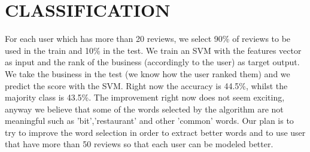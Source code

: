 \documentclass[a4paper, 10pt, conference]{ieeeconf}      %
\begin{document}
\section{CLASSIFICATION}
For each user which has more than 20 reviews, we select 90\% of reviews to be used in the train and 10\% in the test.
We train an SVM with the features vector as input and the rank of the business (accordingly to the user) as target output.\\
We take the business in the test (we know how the user ranked them) and we predict the score with the SVM. Right now the accuracy is 44.5\%, whilst the majority class is 43.5\%.
The improvement right now does not seem exciting, anyway we believe that some of the words selected by the algorithm are not meaningful such as 'bit','restaurant' and other 'common' words. Our plan is to try to improve the word selection in order to extract better words and to use user that have more than 50 reviews so that each user can be modeled better.

\addtolength{\textheight}{-12cm}   %











\end{document}
